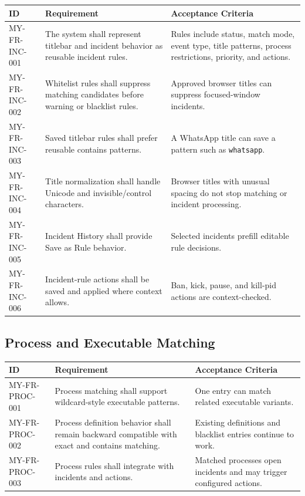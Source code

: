 \documentclass[12pt,a4paper]{article}
\begin{document}
\begin{longtable}{L{0.18\textwidth} L{0.47\textwidth} L{0.25\textwidth}}
\textbf{ID} & \textbf{Requirement} & \textbf{Acceptance Criteria} \\
\hline
MY-FR-INC-001 & The system shall represent titlebar and incident behavior as reusable incident rules. & Rules include status, match mode, event type, title patterns, process restrictions, priority, and actions. \\
MY-FR-INC-002 & Whitelist rules shall suppress matching candidates before warning or blacklist rules. & Approved browser titles can suppress focused-window incidents. \\
MY-FR-INC-003 & Saved titlebar rules shall prefer reusable contains patterns. & A WhatsApp title can save a pattern such as \texttt{whatsapp}. \\
MY-FR-INC-004 & Title normalization shall handle Unicode and invisible/control characters. & Browser titles with unusual spacing do not stop matching or incident processing. \\
MY-FR-INC-005 & Incident History shall provide Save as Rule behavior. & Selected incidents prefill editable rule decisions. \\
MY-FR-INC-006 & Incident-rule actions shall be saved and applied where context allows. & Ban, kick, pause, and kill-pid actions are context-checked. \\
\end{longtable}

\subsection{Process and Executable Matching}

\begin{longtable}{L{0.18\textwidth} L{0.47\textwidth} L{0.25\textwidth}}
\textbf{ID} & \textbf{Requirement} & \textbf{Acceptance Criteria} \\
\hline
MY-FR-PROC-001 & Process matching shall support wildcard-style executable patterns. & One entry can match related executable variants. \\
MY-FR-PROC-002 & Process definition behavior shall remain backward compatible with exact and contains matching. & Existing definitions and blacklist entries continue to work. \\
MY-FR-PROC-003 & Process rules shall integrate with incidents and actions. & Matched processes open incidents and may trigger configured actions. \\
\end{longtable}
\end{document}
